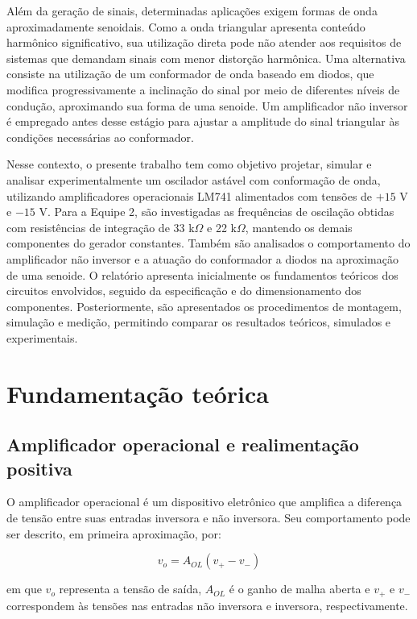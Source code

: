 \documentclass[11pt,a4paper]{article}
\begin{document}
Além da geração de sinais, determinadas aplicações exigem formas de onda aproximadamente senoidais. Como a onda triangular apresenta conteúdo harmônico significativo, sua utilização direta pode não atender aos requisitos de sistemas que demandam sinais com menor distorção harmônica. Uma alternativa consiste na utilização de um conformador de onda baseado em diodos, que modifica progressivamente a inclinação do sinal por meio de diferentes níveis de condução, aproximando sua forma de uma senoide. Um amplificador não inversor é empregado antes desse estágio para ajustar a amplitude do sinal triangular às condições necessárias ao conformador.

Nesse contexto, o presente trabalho tem como objetivo projetar, simular e analisar experimentalmente um oscilador astável com conformação de onda, utilizando amplificadores operacionais LM741 alimentados com tensões de $+15$ V e $-15$ V. Para a Equipe 2, são investigadas as frequências de oscilação obtidas com resistências de integração de 33 k$\Omega$ e 22 k$\Omega$, mantendo os demais componentes do gerador constantes. Também são analisados o comportamento do amplificador não inversor e a atuação do conformador a diodos na aproximação de uma senoide. O relatório apresenta inicialmente os fundamentos teóricos dos circuitos envolvidos, seguido da especificação e do dimensionamento dos componentes. Posteriormente, são apresentados os procedimentos de montagem, simulação e medição, permitindo comparar os resultados teóricos, simulados e experimentais.

\section{Fundamentação teórica}

\subsection{Amplificador operacional e realimentação positiva}

O amplificador operacional é um dispositivo eletrônico que amplifica a diferença de tensão entre suas entradas inversora e não inversora. Seu comportamento pode ser descrito, em primeira aproximação, por:

\begin{equation}
v_o=A_{OL}(v_+-v_-)
\end{equation}

em que $v_o$ representa a tensão de saída, $A_{OL}$ é o ganho de malha aberta e $v_+$ e $v_-$ correspondem às tensões nas entradas não inversora e inversora, respectivamente.
\end{document}
